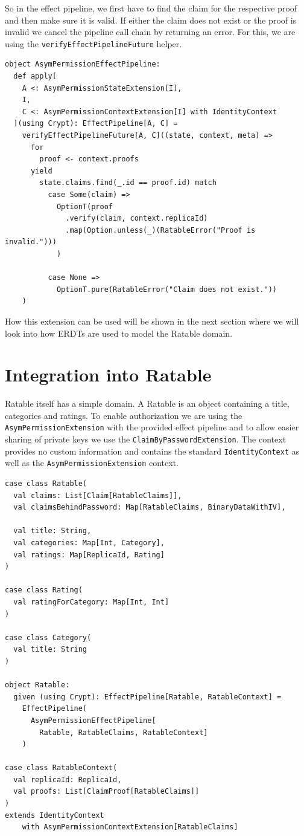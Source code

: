 \documentclass[
	english,
	ruledheaders=section,   %
	class=report,		    %
	thesis={type=bachelor}, %
	accentcolor=9c,			%
	custommargins=true,    %
	marginpar=false,        %
	parskip=half-,          %
	fontsize=11pt,          %
]{tudapub}
\begin{document}
So in the effect pipeline, we first have to find the claim for the respective proof and then make sure it is valid. If either the claim does not exist or the proof is invalid we cancel the pipeline call chain by returning an error. For this, we are using the \texttt{verifyEffectPipelineFuture} helper.

\begin{lstlisting}
object AsymPermissionEffectPipeline:
  def apply[
    A <: AsymPermissionStateExtension[I], 
    I, 
    C <: AsymPermissionContextExtension[I] with IdentityContext
  ](using Crypt): EffectPipeline[A, C] =
    verifyEffectPipelineFuture[A, C]((state, context, meta) =>
      for
        proof <- context.proofs
      yield
        state.claims.find(_.id == proof.id) match
          case Some(claim) => 
            OptionT(proof
              .verify(claim, context.replicaId)
              .map(Option.unless(_)(RatableError("Proof is invalid.")))
            )

          case None => 
            OptionT.pure(RatableError("Claim does not exist."))
    )
\end{lstlisting}

How this extension can be used will be shown in the next section where we will look into how ERDTs are used to model the Ratable domain.

\section{Integration into Ratable}
Ratable itself has a simple domain. A Ratable is an object containing a title, categories and ratings. To enable authorization we are using the \texttt{AsymPermissionExtension} with the provided effect pipeline and to allow easier sharing of private keys we use the \texttt{ClaimByPasswordExtension}. The context provides no custom information and contains the standard \texttt{IdentityContext} as well as the \texttt{AsymPermissionExtension} context.

\begin{lstlisting}
case class Ratable(
  val claims: List[Claim[RatableClaims]],
  val claimsBehindPassword: Map[RatableClaims, BinaryDataWithIV],

  val title: String,
  val categories: Map[Int, Category],
  val ratings: Map[ReplicaId, Rating]
)

case class Rating(
  val ratingForCategory: Map[Int, Int]
)

case class Category(
  val title: String
)

object Ratable:
  given (using Crypt): EffectPipeline[Ratable, RatableContext] = 
    EffectPipeline(
      AsymPermissionEffectPipeline[
        Ratable, RatableClaims, RatableContext]
    )

case class RatableContext(
  val replicaId: ReplicaId,
  val proofs: List[ClaimProof[RatableClaims]]
) 
extends IdentityContext 
    with AsymPermissionContextExtension[RatableClaims]
\end{lstlisting}
\end{document}
